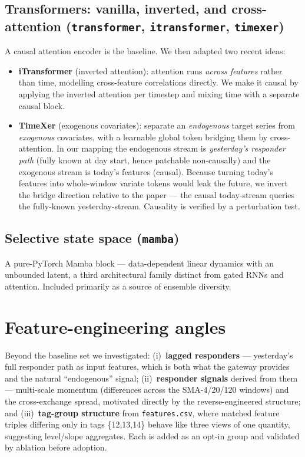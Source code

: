 \documentclass[11pt]{article}
\begin{document}
\subsection{Transformers: vanilla, inverted, and cross-attention (\texttt{transformer}, \texttt{itransformer}, \texttt{timexer})}
A causal attention encoder is the baseline. We then adapted two recent ideas:
\begin{itemize}[leftmargin=1.2em,itemsep=1pt]
  \item \textbf{iTransformer} (inverted attention): attention runs \emph{across
  features} rather than time, modelling cross-feature correlations directly. We
  make it causal by applying the inverted attention per timestep and mixing time
  with a separate causal block.
  \item \textbf{TimeXer} (exogenous covariates): separate an \emph{endogenous}
  target series from \emph{exogenous} covariates, with a learnable global token
  bridging them by cross-attention. In our mapping the endogenous stream is
  \emph{yesterday's responder path} (fully known at day start, hence patchable
  non-causally) and the exogenous stream is today's features (causal). Because
  turning today's features into whole-window variate tokens would leak the
  future, we invert the bridge direction relative to the paper --- the causal
  today-stream queries the fully-known yesterday-stream. Causality is verified
  by a perturbation test.
\end{itemize}

\subsection{Selective state space (\texttt{mamba})}
A pure-PyTorch Mamba block --- data-dependent linear dynamics with an unbounded
latent, a third architectural family distinct from gated RNNs and attention.
Included primarily as a source of ensemble diversity.

\section{Feature-engineering angles}
Beyond the baseline set we investigated: (i)~\textbf{lagged responders} ---
yesterday's full responder path as input features, which is both what the
gateway provides and the natural ``endogenous'' signal; (ii)~\textbf{responder
signals} derived from them --- multi-scale momentum (differences across the
SMA-4/20/120 windows) and the cross-exchange spread, motivated directly by the
reverse-engineered structure; and (iii)~\textbf{tag-group structure} from
\texttt{features.csv}, where matched feature triples differing only in tags
\{12,13,14\} behave like three views of one quantity, suggesting level/slope
aggregates. Each is added as an opt-in group and validated by ablation before
adoption.
\end{document}
